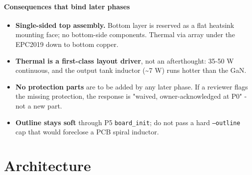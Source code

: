 \documentclass[11pt,a4paper]{article}
\begin{document}
\paragraph*{Consequences that bind later phases}
\begin{itemize}
\item \textbf{Single-sided top assembly.} Bottom layer is reserved as a flat heatsink mounting face; no
bottom-side components. Thermal via array under the EPC2019 down to bottom copper.
\item \textbf{Thermal is a first-class layout driver}, not an afterthought: 35-50 W continuous, and the
output tank inductor (\textasciitilde{}7 W) runs hotter than the GaN.
\item \textbf{No protection parts} are to be added by any later phase. If a reviewer flags the missing
protection, the response is "waived, owner-acknowledged at P0" - not a new part.
\item \textbf{Outline stays soft} through P5 \texttt{board\_init}; do not pass a hard \texttt{--outline} cap that would
foreclose a PCB spiral inductor.
\end{itemize}
\section{Architecture}
\end{document}
